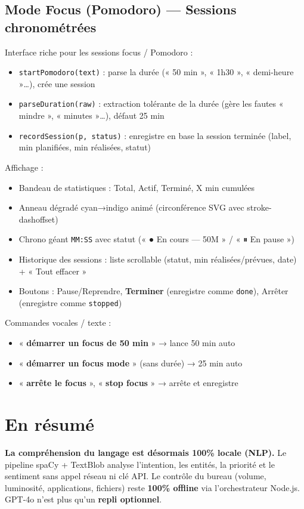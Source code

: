 \documentclass[12pt,a4paper]{article}
\begin{document}
\subsection*{Mode Focus (Pomodoro) — Sessions chronométrées}

Interface riche pour les sessions focus / Pomodoro :

\begin{itemize}
  \item \texttt{startPomodoro(text)} : parse la durée (« 50 min », « 1h30 », « demi-heure »…), crée une session
  \item \texttt{parseDuration(raw)} : extraction tolérante de la durée (gère les fautes « mindre », « minutes »…), défaut 25 min
  \item \texttt{recordSession(p, status)} : enregistre en base la session terminée (label, min planifiées, min réalisées, statut)
\end{itemize}

Affichage :
\begin{itemize}
  \item Bandeau de statistiques : Total, Actif, Terminé, X min cumulées
  \item Anneau dégradé cyan→indigo animé (circonférence SVG avec stroke-dashoffset)
  \item Chrono géant \texttt{MM:SS} avec statut (« ● En cours — 50M » / « ⏸ En pause »)
  \item Historique des sessions : liste scrollable (statut, min réalisées/prévues, date) + « Tout effacer »
  \item Boutons : Pause/Reprendre, \textbf{Terminer} (enregistre comme \texttt{done}), Arrêter (enregistre comme \texttt{stopped})
\end{itemize}

Commandes vocales / texte :
\begin{itemize}
  \item « \textbf{démarrer un focus de 50 min} » → lance 50 min auto
  \item « \textbf{démarrer un focus mode} » (sans durée) → 25 min auto
  \item « \textbf{arrête le focus} », « \textbf{stop focus} » → arrête et enregistre
\end{itemize}

\section{En résumé}

\textbf{La compréhension du langage est désormais 100\% locale (NLP).}
Le pipeline spaCy + TextBlob analyse l'intention, les entités, la priorité
et le sentiment sans appel réseau ni clé API. Le contrôle du bureau (volume,
luminosité, applications, fichiers) reste \textbf{100\% offline} via
l'orchestrateur Node.js. GPT-4o n'est plus qu'un \textbf{repli optionnel}.
\end{document}
